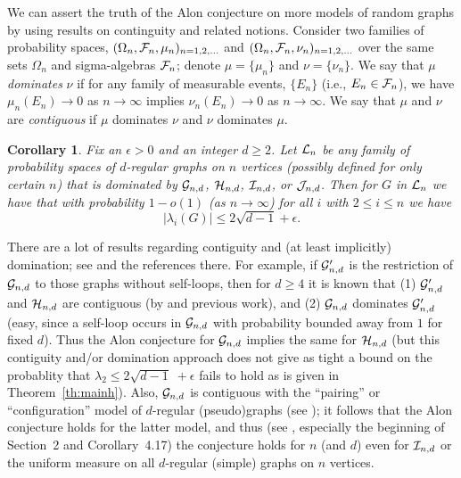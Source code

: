 \documentclass[12pt]{article}
\newtheorem{corollary}[theorem]{Corollary}
\newcommand{\cg}{{\cal G}}
\newcommand{\ch}{{\cal H}}
\newcommand{\ci}{{\cal I}}
\newcommand{\cj}{{\cal J}}
\newcommand{\cjnd}{\cj_{n,d}}
\newcommand{\cind}{\ci_{n,d}}
\newcommand{\cgnd}{\cg_{n,d}}
\newcommand{\chnd}{\ch_{n,d}}
\begin{document}
We can assert the truth of the
Alon conjecture on more models of random graphs
by using results on continguity and related notions.
Consider
two families of probability spaces, 
$(\Omega_n,{\cal F}_n,\mu_n)_{n=1,2,\ldots}$ and
$(\Omega_n,{\cal F}_n,\nu_n)_{n=1,2,\ldots}$ over the same sets
$\Omega_n$ and sigma-algebras ${\cal F}_n$; denote
$\mu=\{\mu_n\}$
and $\nu=\{\nu_n\}$.  We say that $\mu$ {\em dominates} $\nu$ if
for any family of measurable events,
$\{E_n\}$ (i.e., $E_n\in{\cal F}_n$), we have $\mu_n(E_n)\to 0$ as
$n\to\infty$ implies $\nu_n(E_n)\to 0$ as $n\to\infty$.
We say that $\mu$ and $\nu$ are {\em contiguous} if $\mu$ dominates $\nu$
and $\nu$ dominates $\mu$.
\begin{corollary} Fix an $\epsilon>0$ and an integer
$d\ge 2$.  Let ${\cal L}_{n}$
be any family of probability spaces of $d$-regular graphs on $n$ vertices
(possibly defined for only certain $n$)
that is dominated by $\cgnd$, $\chnd$, $\cind$, or $\cjnd$.
Then
for $G$ in ${\cal L}_n$ we have that with probability $1-o(1)$ 
(as $n\to\infty$) for
all $i$ with $2\le i\le n$ we have
$$
|\lambda_i(G)|\le 2\sqrt{d-1}+\epsilon.
$$
\end{corollary}
There are a lot of results regarding contiguity and (at least
implicitly) domination; see \cite{greenhill,kim,wormald} and the references
there.  For example, if $\cgnd'$ is the restriction of $\cgnd$ to those
graphs without self-loops, then for $d\ge 4$ it is known that
(1) $\cgnd'$ and $\chnd$ are contiguous (by \cite{kim} and previous work), and
(2) $\cgnd$ dominates $\cgnd'$ (easy, since a self-loop occurs 
in $\cgnd$ with 
probability bounded away from $1$ for fixed $d$).  
Thus the Alon conjecture for
$\cgnd$ implies the same for $\chnd$ (but this contiguity and/or domination
approach does not give as tight a bound on the probablity that
$\lambda_2\le 2\sqrt{d-1}\;+\epsilon$ fails to hold as is given
in Theorem~\ref{th:mainh}).
Also, $\cgnd$ is contiguous
with the ``pairing'' or ``configuration'' model of $d$-regular (pseudo)graphs
(see \cite{greenhill}); it follows that the Alon conjecture holds for the
latter model, and thus
(see \cite{wormald}, especially the beginning of Section~2 and
Corollary~4.17)
the conjecture holds for $n$ (and $d$) even
for $\cind$ or the uniform
measure on all $d$-regular (simple) graphs on $n$ vertices.
\end{document}

